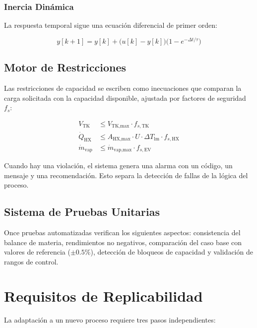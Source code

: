\documentclass[10pt,letterpaper]{article}
\begin{document}
\subsubsection{Inercia Din\'amica}

La respuesta temporal sigue una ecuaci\'on diferencial de primer orden:

\begin{equation}
y[k+1] = y[k] + \bigl( u[k] - y[k] \bigr) \bigl( 1 - e^{-\Delta t / \tau} \bigr) \label{eq:inertia_discrete}
\end{equation}

\subsection{Motor de Restricciones}

Las restricciones de capacidad se escriben como inecuaciones que comparan la carga solicitada con la capacidad disponible, ajustada por factores de seguridad $f_s$:

\begin{align}
V_{\text{TK}} &\leq V_{\text{TK,max}} \cdot f_{s,\text{TK}} \label{eq:constr_tank} \\
\dot{Q}_{\text{HX}} &\leq A_{\text{HX,max}} \cdot U \cdot \Delta T_{\text{lm}} \cdot f_{s,\text{HX}} \label{eq:constr_hx} \\
\dot{m}_{\text{vap}} &\leq \dot{m}_{\text{vap,max}} \cdot f_{s,\text{EV}} \label{eq:constr_evap}
\end{align}

Cuando hay una violaci\'on, el sistema genera una alarma con un c\'odigo, un mensaje y una recomendaci\'on. Esto separa la detecci\'on de fallas de la l\'ogica del proceso.

\subsection{Sistema de Pruebas Unitarias}

Once pruebas automatizadas verifican los siguientes aspectos: consistencia del balance de materia, rendimientos no negativos, comparaci\'on del caso base con valores de referencia ($\pm0.5\%$), detecci\'on de bloqueos de capacidad y validaci\'on de rangos de control.

\section{Requisitos de Replicabilidad}

La adaptaci\'on a un nuevo proceso requiere tres pasos independientes:
\end{document}
